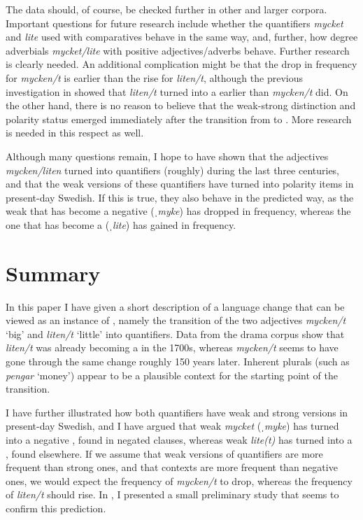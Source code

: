 \documentclass[output=paper]{langscibook}
\begin{document}
The data should, of course, be checked further in other and larger corpora. Important questions for future research include whether the quantifiers \textit{mycket} and \textit{lite} used with comparatives behave in the same way, and, further, how degree adverbials \textit{mycket/lite} with positive adjectives/adverbs behave. Further research is clearly needed. An additional complication might be that the drop in frequency for \textit{mycken/t} is earlier than the rise for \textit{liten/t}, although the previous investigation in  showed that \textit{liten/t} turned into a  earlier than \textit{mycken/t} did. On the other hand, there is no reason to believe that the weak-strong distinction and polarity status emerged immediately after the transition from  to . More research is needed in this respect as well.



Although many questions remain, I hope to have shown that the adjectives \textit{mycken/liten} turned into quantifiers (roughly) during the last three centuries, and that the weak versions of these quantifiers have turned into polarity items in present-day Swedish. If this is true, they also behave in the predicted way, as the weak  that has become a negative  (\textit{ˌmyke}) has dropped in frequency, whereas the one that has become a  (\textit{ˌlite}) has gained in frequency.


\section{Summary}\label{sec:delsing:7}


In this paper I have given a short description of a language change that can be viewed as an instance of , namely the transition of the two adjectives \textit{mycken/t} ‘big’ and \textit{liten/t} ‘little’ into quantifiers. Data from the drama corpus show that \textit{liten/t} was already becoming a  in the 1700s, whereas \textit{mycken/t} seems to have gone through the same change roughly 150 years later. Inherent plurals (such as \textit{pengar} ‘money’) appear to be a plausible context for the starting point of the transition.



I have further illustrated how both quantifiers have weak and strong versions in present-day Swedish, and I have argued that weak \textit{mycket} (\textit{ˌmyke}) has turned into a negative , found in negated clauses, whereas weak \textit{lite(t)} has turned into a , found elsewhere. If we assume that weak versions of quantifiers are more frequent than strong ones, and that  contexts are more frequent than negative ones, we would expect the frequency of \textit{mycken/t} to drop, whereas the frequency of \textit{liten/t} should rise. In , I presented a small preliminary study that seems to confirm this prediction.
\end{document}
